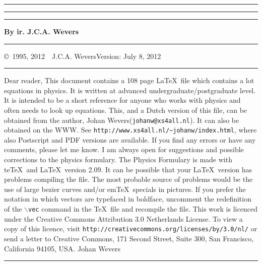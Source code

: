 \thispagestyle{empty}
\setcounter{page}{0}
\hrule
\rule{.4pt}{22.85cm}\hspace*{154mm}\rule{.4pt}{22.85cm}
\vspace*{-18cm}
\begin{center}
\Huge
{}
\end{center}
\vspace{2cm}
\centerline{\Large\bf By ir. J.C.A. Wevers}
\vspace*{2cm}
\vfill
\hrule
\newpage
\thispagestyle{empty}
\copyright~1995, 2012~~J.C.A. Wevers\hfill Version: July 8, 2012
\npar
\hrule
\par
\bigskip
Dear reader,
\npar
This document contains a 108 page \LaTeX\ file which contains a lot equations
in physics. It is written at advanced undergraduate/postgraduate level. It is
intended to be a short reference for anyone who works with physics and often
needs to look up equations.
\npar
This, and a Dutch version of this file, can be obtained from the author,
Johan Wevers\linebreak ({\tt johanw@xs4all.nl}).
\npar
It can also be obtained on the WWW. See
{\tt http://www.xs4all.nl/\~{}johanw/index.html}, where also Postscript
and PDF versions are available.
\npar
If you find any errors or have any comments, please let me know. I am always
open for suggestions and possible corrections to the physics formulary.
\npar
The Physics Formulary is made with te\TeX\ and \LaTeX\ version 2.09. It can
be possible that your \LaTeX\ version has problems compiling the file. The
most probable source of problems would be the use of large bezier curves
and/or em\TeX\ specials in pictures. If you prefer the notation in which
vectors are typefaced in boldface, uncomment the redefinition of the
{\tt $\backslash$vec} command in the \TeX\ file and recompile the file.
\npar
This work is licenced under the Creative Commons Attribution 3.0 Netherlands License.
To view a copy of this licence, visit {\tt http://creativecommons.org/licenses/by/3.0/nl/} or send
a letter to Creative Commons, 171 Second Street, Suite 300, San Francisco, California 94105, USA.
\npar
Johan Wevers
\vfill
\hrule
\newpage

\tableofcontents
\newpage


